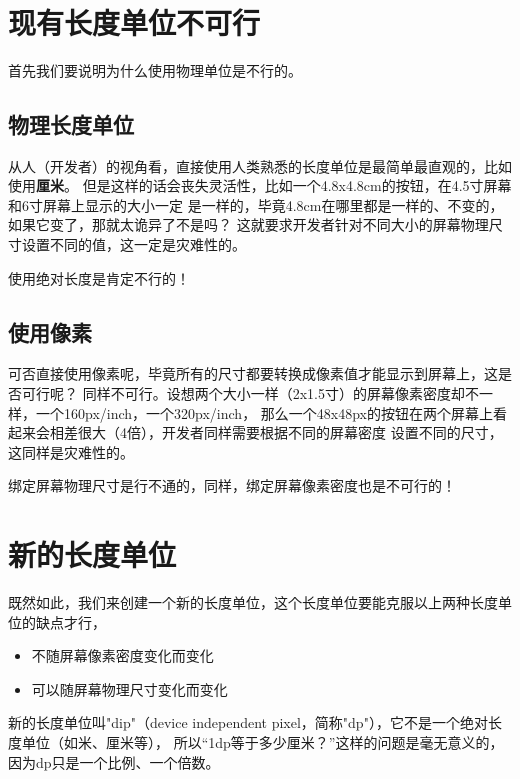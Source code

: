 \documentclass[a4paper,11pt]{article}
\begin{document}
\tt %
\pagestyle{header}
\sybmaketitle
\tableofcontents
\newpage

\pagestyle{main}
\setcounter{page}{1}

\section[现有长度单位不可行]{现有长度单位不可行}
首先我们要说明为什么使用物理单位是不行的。

\subsection[物理长度单位]{物理长度单位}
从人（开发者）的视角看，直接使用人类熟悉的长度单位是最简单最直观的，比如使用{\bf 厘米}。
但是这样的话会丧失灵活性，比如一个4.8x4.8cm的按钮，在4.5寸屏幕和6寸屏幕上显示的大小一定
是一样的，毕竟4.8cm在哪里都是一样的、不变的，如果它变了，那就太诡异了不是吗？
这就要求开发者针对不同大小的屏幕物理尺寸设置不同的值，这一定是灾难性的。

使用绝对长度是肯定不行的！

\subsection[使用像素]{使用像素}
可否直接使用像素呢，毕竟所有的尺寸都要转换成像素值才能显示到屏幕上，这是否可行呢？
同样不可行。设想两个大小一样（2x1.5寸）的屏幕像素密度却不一样，一个160px/inch，一个320px/inch，
那么一个48x48px的按钮在两个屏幕上看起来会相差很大（4倍），开发者同样需要根据不同的屏幕密度
设置不同的尺寸，这同样是灾难性的。

绑定屏幕物理尺寸是行不通的，同样，绑定屏幕像素密度也是不可行的！


\section[新的长度单位]{新的长度单位}
既然如此，我们来创建一个新的长度单位，这个长度单位要能克服以上两种长度单位的缺点才行，
\begin{itemize}
  \item 不随屏幕像素密度变化而变化
  \item 可以随屏幕物理尺寸变化而变化
\end{itemize}
新的长度单位叫"dip"（device independent pixel，简称"dp"），它不是一个绝对长度单位（如米、厘米等），
所以“1dp等于多少厘米？”这样的问题是毫无意义的，因为dp只是一个比例、一个倍数。
\end{document}
